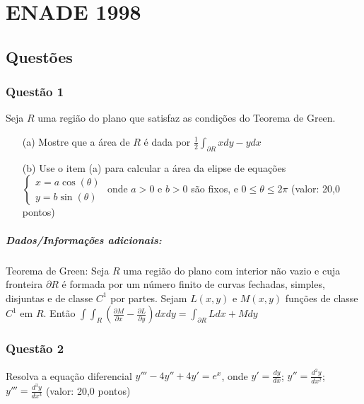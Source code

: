 \chapter{ENADE 1998}

\section{\color{blue} Quest\~oes}

\subsection{\color{blue} Quest\~ao 1}

Seja $R$ uma regi\~ao do plano que satisfaz as condi\c c\~oes do Teorema de Green.

\begin{enumerate}

\item[(a)] Mostre que a \'area de $R$ \'e dada por $\displaystyle \frac1{2} \int_{\partial R} x dy - y dx$

\item[(b)] Use o item (a) para calcular a \'area da elipse de equa\c c\~oes $\begin{cases} x=a\cos(\theta) \\ y=b\sin(\theta)\end{cases}$ onde $a > 0$ e $b > 0$ s\~ao fixos, e $0 \leq \theta \leq 2 \pi$ (valor: 20,0 pontos)

\end{enumerate}

\paragraph{Dados/Informa\c c\~oes adicionais:} Teorema de Green: Seja $R$ uma regi\~ao do plano com interior n\~ao vazio e cuja fronteira $\partial R$ \'e formada por um n\'umero finito de curvas fechadas, simples, disjuntas e de classe $C^1$ por partes. Sejam $L(x,y)$ e $M(x,y)$ fun\c c\~oes de classe $C^1$ em $R$. Ent\~ao $\displaystyle \int\!\int_R \left(\frac{\partial M}{\partial x}-\frac{\partial L}{\partial y}\right)dx dy=\int_{\partial R} L dx + M dy$

\subsection{\color{blue} Quest\~ao 2}

Resolva a equa\c c\~ao diferencial $y'''- 4y'' + 4y' = e^x$, onde $y'=\displaystyle\frac{dy}{dx}$; $y''=\displaystyle\frac{d^2 y}{dx^2}$; $y'''=\displaystyle\frac{d^3 y}{dx^3}$ (valor: 20,0 pontos)

